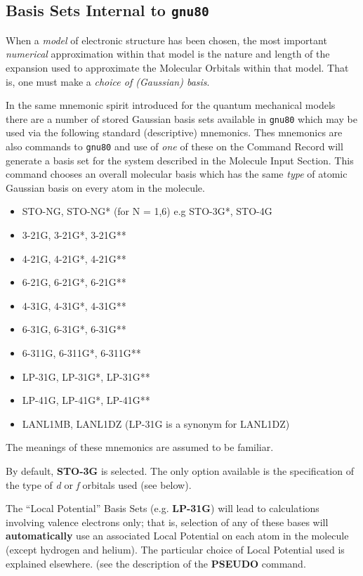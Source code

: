 \subsection{\sf Basis Sets Internal to {\tt gnu80}}
\label{basis}
When a {\em model} of electronic structure has been chosen, the most
important {\em numerical} approximation within that model is the nature
and length of the expansion used to approximate the Molecular Orbitals
within that model. That is, one must make a {\em choice of (Gaussian)
basis}.

In the same mnemonic spirit introduced for the quantum
mechanical models there are a number of stored Gaussian basis sets
available in {\tt gnu80} which may be used via the following
standard (descriptive) mnemonics. 
Thes mnemonics are also commands to {\tt gnu80} and use of {\em one} of these
on the Command Record
will generate a basis set for the system described in the
Molecule Input Section.
This command chooses an overall molecular basis
which has the same {\em type} of
atomic Gaussian basis on every atom in the molecule.
{\bf 
\begin{itemize}
\item STO-NG, STO-NG* (for N = 1,6) e.g STO-3G*, STO-4G
\item  3-21G, 3-21G*, 3-21G**
\item  4-21G, 4-21G*, 4-21G**
\item  6-21G, 6-21G*, 6-21G**
\item  4-31G, 4-31G*, 4-31G**
\item  6-31G, 6-31G*, 6-31G**
\item  6-311G, 6-311G*, 6-311G**
\item  LP-31G, LP-31G*, LP-31G**
\item  LP-41G, LP-41G*, LP-41G**
\item  LANL1MB, LANL1DZ (LP-31G is a synonym for LANL1DZ)
\end{itemize}
}
The meanings of these mnemonics are assumed to be familiar.

By default, {\bf STO-3G} is selected. The only  option available is the
specification of the type of {\em d} or {\em f} orbitals used
(see below). 

The ``Local
Potential'' Basis Sets  (e.g. {\bf LP-31G}) will lead to 
calculations involving valence
electrons only; that is, selection of any of these bases
will {\bf automatically} use an associated Local Potential
on each atom in the molecule (except hydrogen and helium).
The particular choice of Local Potential used is explained elsewhere.
(see the description of the {\bf PSEUDO} command.

